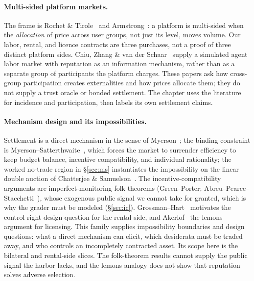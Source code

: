 \documentclass[11pt,a4paper]{article}
\theoremstyle{definition}
\theoremstyle{definition}
\theoremstyle{remark}
\begin{document}
\paragraph{Multi-sided platform markets.} The frame is Rochet \&
Tirole~ and Armstrong~: a platform
is multi-sided when the \emph{allocation} of price across user groups, not just its
level, moves volume. Our labor, rental, and licence contracts are three purchases, not a proof of
three distinct platform sides. Chiu, Zhang \& van der Schaar~
supply a simulated agent labor market with reputation as an information
mechanism, rather than as a separate group of participants the platform charges.
These papers ask how cross-group participation creates externalities and how
prices allocate them; they do not supply a trust oracle or bonded settlement.
The chapter uses the literature for
incidence and participation, then labels its own settlement claims.

\paragraph{Mechanism design and its impossibilities.} Settlement is a direct
mechanism in the sense of Myerson~; the binding constraint is
Myerson--Satterthwaite~, which forces the market to surrender
efficiency to keep budget balance, incentive compatibility, and individual
rationality; the worked no-trade region in \S\ref{sec:ms} instantiates the
impossibility on the linear double auction of Chatterjee \&
Samuelson~. The incentive-compatibility arguments are imperfect-monitoring folk
theorems (Green--Porter; Abreu--Pearce--Stacchetti~), whose exogenous
public signal we cannot take for granted, which is why the grader must be
modeled (\S\ref{sec:ic}).
Grossman--Hart~ motivates the control-right design question for
the rental side, and Akerlof~ the lemons argument for licensing.
This family supplies impossibility boundaries and design questions: what a
direct mechanism can elicit, which desiderata must be traded away, and who
controls an incompletely contracted asset. Its scope here is the bilateral and
rental-side slices. The folk-theorem results cannot supply the public
signal the harbor lacks, and the lemons analogy does not show that
reputation solves adverse selection.
\end{document}

